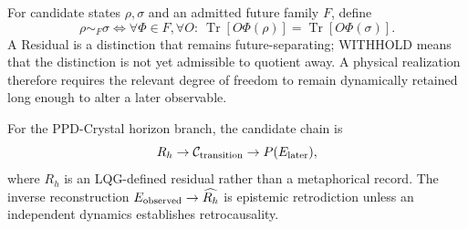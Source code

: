 \documentclass[10pt]{article}
\theoremstyle{pe}
\theoremstyle{definition}
\begin{document}
For candidate states $\rho,\sigma$ and an admitted future family $F$, define
\[
\rho\sim_F\sigma
\iff
\forall\Phi\in F,\forall O:\ \operatorname{Tr}[O\Phi(\rho)]=\operatorname{Tr}[O\Phi(\sigma)].
\]
A Residual is a distinction that remains future-separating; WITHHOLD means that the distinction is not yet admissible to quotient away. A physical realization therefore requires the relevant degree of freedom to remain dynamically retained long enough to alter a later observable.

For the PPD-Crystal horizon branch, the candidate chain is
\[
R_h\to\mathcal C_{\rm transition}\to P(E_{\rm later}),
\]
where $R_h$ is an LQG-defined residual rather than a metaphorical record. The inverse reconstruction $E_{\rm observed}\to\widehat{R_h}$ is epistemic retrodiction unless an independent dynamics establishes retrocausality.
\end{document}
